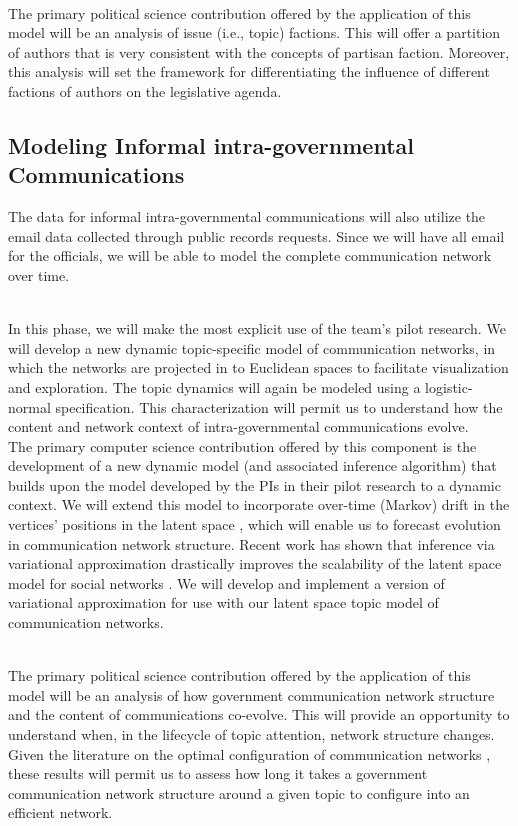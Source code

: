 ~\\
 The primary political science contribution offered by the application of this model will be an analysis of issue (i.e., topic) factions. This will offer a partition of authors that is very consistent with the concepts of partisan faction. Moreover, this analysis will set the framework for differentiating the influence of different factions of authors on the legislative agenda.

\subsection{Modeling Informal intra-governmental Communications}

 The data for informal
intra-governmental communications will also utilize the email data
collected through public records requests. Since we will have all
email for the officials, we will be able to model the complete
communication network over time.

~\\
 In this phase, we will make the
most explicit use of the team's pilot research. We will develop a new
dynamic topic-specific model of communication networks, in which the
networks are projected in to Euclidean spaces to facilitate
visualization and exploration. The topic dynamics will again be
modeled using a logistic-normal specification. This characterization
will permit us to understand how the content and network context of
intra-governmental communications evolve.
~\\
 The primary computer
science contribution offered by this component is the development of a
new dynamic model (and associated inference algorithm) that builds
upon the model developed by the PIs in their pilot research
\cite{Krafft2012} to a dynamic context. We will extend this model to
incorporate over-time (Markov) drift in the vertices' positions in the
latent space \cite{Sarkar2005}, which will enable us to forecast
evolution in communication network structure. Recent work has shown that inference via variational approximation drastically improves the scalability of the latent space model for social networks \cite{SalterTownshend2013}. We will develop and implement a version of variational approximation for use with our latent space topic model of communication networks.

~\\
 The primary political science contribution offered by the application of this model will be an analysis of how government communication network structure and the content of communications co-evolve. This will provide an opportunity to understand when, in the lifecycle of topic attention, network structure changes. Given the literature on the optimal configuration of communication networks \cite{Mason2008,Mason2012}, these results will permit us to assess how long it takes  a government communication network structure around a given topic to configure into an efficient network.




